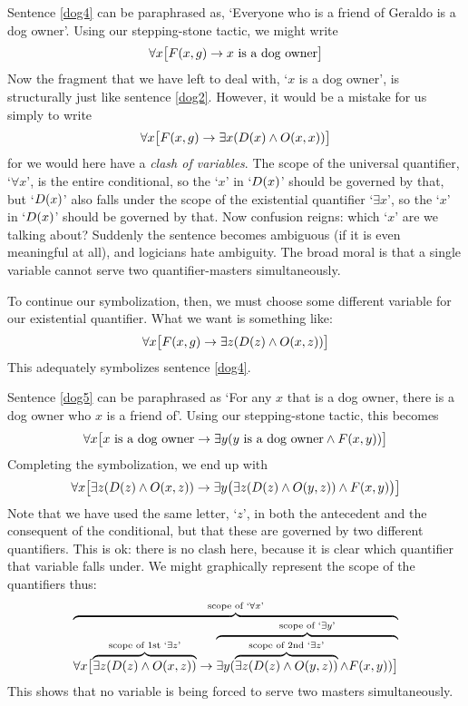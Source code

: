 Sentence \ref{dog4} can be paraphrased as, `Everyone who is a friend of Geraldo is a dog owner'. Using our stepping-stone tactic, we might write 
$$\forall x \bigl[\mathord{F}(x,g) \rightarrow x \text{ is a dog owner}\bigr]$$
Now the fragment that we have left to deal with, `$x$ is a dog owner', is structurally just like sentence \ref{dog2}. However, it would be a mistake for us simply to write 
$$\forall x \bigl[\mathord{F}(x,g) \rightarrow \exists x(\mathord{D}(x) \wedge \mathord{O}(x,x))\bigr]$$
for we would here have a \emph{clash of variables}. The scope of the universal quantifier, `$\forall x$', is the entire conditional, so the `$x$' in `$\mathord{D}(x)$' should be governed by that, but `$\mathord{D}(x)$' also falls under the scope of the existential quantifier `$\exists x$', so the `$x$' in `$\mathord{D}(x)$' should be governed by that. Now confusion reigns: which `$x$' are we talking about? Suddenly the sentence becomes ambiguous (if it is even meaningful at all), and logicians hate ambiguity. The broad moral is that a single variable cannot serve two quantifier-masters simultaneously. 

To continue our symbolization, then, we must choose some different variable for our existential quantifier. What we want is something like:
$$\forall x\bigl[\mathord{F}(x,g) \rightarrow\exists z(\mathord{D}(z) \wedge \mathord{O}(x,z))\bigr]$$
This adequately symbolizes sentence \ref{dog4}.

Sentence \ref{dog5} can be paraphrased as `For any $x$ that is a dog owner, there is a dog owner who $x$ is a friend of'. Using our stepping-stone tactic, this becomes 
$$\forall x\bigl[\mbox{$x$ is a dog owner}\rightarrow\exists y(\mbox{$y$ is a dog owner}\wedge \mathord{F}(x,y))\bigr]$$
Completing the symbolization, we end up with
$$\forall x\bigl[\exists z(\mathord{D}(z) \wedge \mathord{O}(x,z))\rightarrow\exists y\bigl(\exists z(\mathord{D}(z) \wedge \mathord{O}(y,z))\wedge \mathord{F}(x,y)\bigr)\bigr]$$
Note that we have used the same letter, `$z$', in both the antecedent and the consequent of the conditional, but that these are governed by two different quantifiers. This is ok: there is no clash here, because it is clear which quantifier that variable falls under. We might graphically represent the scope of the quantifiers thus:
$$\overbrace{\forall x\bigl[\overbrace{\exists z(\mathord{D}(z) \wedge \mathord{O}(x,z))}^{\text{scope of 1st `}\exists z\text{'}}\rightarrow \overbrace{\exists y(\overbrace{\exists z(\mathord{D}(z) \wedge \mathord{O}(y,z))}^{\text{scope of 2nd `}\exists z\text{'}}\wedge \mathord{F}(x,y))\bigr]}^{\text{scope of `}\exists y\text{'}}}^{\text{scope of `}\forall x\text{'}}$$
This shows that no variable is being forced to serve two masters simultaneously.

